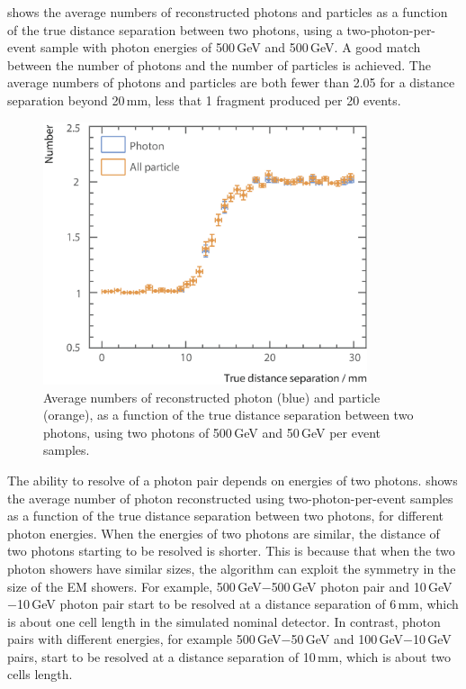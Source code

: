  shows  the average numbers of reconstructed photons and particles  as a function of the true distance separation between two photons, using a two-photon-per-event sample with photon energies of  500\,GeV and 500\,GeV. A good match between the number of photons and the number of particles is achieved. The average numbers of photons and particles are  both fewer than 2.05 for a distance separation beyond 20\,mm, less that 1 fragment produced per 20 events.



\begin{figure}[tbph]
\centering
        \includegraphics[width=0.85\textwidth]{photon/DoubleN_pN_all2}
        \caption{Average numbers of reconstructed photon  (blue) and particle (orange), as a function of the true distance separation between two photons, using two photons of 500\,GeV and 50\,GeV per event samples. }
        \label{fig:photonDoubleCompareN_pN_all}
\end{figure}

The ability to  resolve of a photon pair depends on energies of two photons.  shows the average number of photon reconstructed using two-photon-per-event samples as a function of the true distance separation between two photons, for different photon energies. When the energies of two photons are similar, the distance of two photons starting to be resolved is shorter. This is because that when the two photon showers have similar sizes, the \peakFinding algorithm can exploit the symmetry in the size of the EM showers. For example, 500\,GeV$-$500\,GeV photon pair and 10\,GeV$-$10\,GeV photon pair start to be resolved at a distance separation of 6\,mm, which is about one \ECAL cell length in the simulated nominal \ILD detector. In contrast, photon pairs with different energies, for example 500\,GeV$-$50\,GeV and  100\,GeV$-$10\,GeV pairs, start to be resolved at a distance separation of 10\,mm, which is about two \ECAL cells length.

